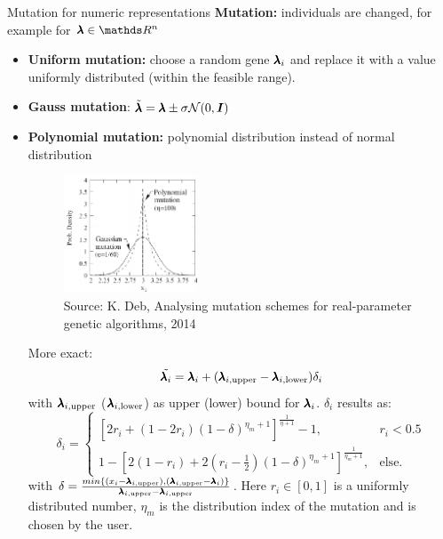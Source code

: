 \begin{frame}{Mutation for numeric representations}
  \textbf{Mutation:} individuals are changed, for example for $\xx \in \R^n$
  \begin{itemize}
  \item \textbf{Uniform mutation:} choose a random gene $\xxi$ and replace it with a value uniformly distributed (within the feasible range).
  \item \textbf{Gauss mutation}: $\tilde\xx = \xx \pm \sigma \mathcal{N}(0, \boldsymbol{I})$
  \item \textbf{Polynomial mutation:} polynomial distribution instead of normal distribution
  \begin{center}
  \begin{figure}
    \includegraphics[height = 3.5cm, width = 4cm]{images/polynomial_mutation.png}\\
    \scriptsize{Source: K. Deb, Analysing mutation schemes for real-parameter genetic algorithms, 2014}
  \end{figure}
   \end{center}
   \framebreak
  More exact:
  $$
  {\tilde \xxi} = \xxi + (\xxi[i,\text{upper}] - \xxi[i,\text{lower}]) \delta_{i}
  $$
  with $\xxi[i,\text{upper}]$ ($\xxi[i,\text{lower}]$) as upper (lower) bound for $\xxi$.
  $\delta_{i}$ results as:
  \footnotesize
  $$
  \delta_{i} =
  \begin{cases}
  [2r_{i}+(1-2r_{i})(1-\delta)^{\eta_{m}+1}]^{\frac{1}{\eta +1}} -1, & r_{i} < 0.5 \\
  1 - [2(1-r_{i})+2(r_{i}-\frac{1}{2})(1-\delta)^{\eta_{m}+1}]^{\frac{1}{\eta_{m} +1}}, &  \text{else.}
  \end{cases}
  $$
  with  $\delta = \frac{min\{(x_{i} - \xxi[i,\text{upper}]), (\xxi[i,\text{upper}]-\xxi)\}}{\xxi[i,\text{upper}] - \xxi[i,\text{upper}]}$.
  \normalsize
  \vspace{0.5cm}
  Here $r_{i} \in [0,1]$ is a uniformly distributed number, $\eta_{m}$ is the distribution index of the mutation and is chosen by the user.\\
  \normalsize
  \end{itemize}
  \vspace{0.5cm}

  \end{frame}

